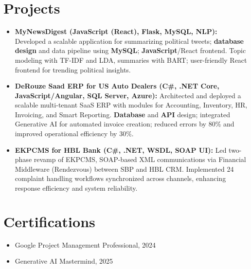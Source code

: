 \documentclass[letterpaper,10pt]{article}
\begin{document}
\section{Projects}
\begin{itemize}
    \setlength\itemsep{3pt}
    \item \textbf{MyNewsDigest (\textbf{JavaScript} (React), Flask, \textbf{MySQL}, NLP):} Developed a scalable application for summarizing political tweets; \textbf{database design} and data pipeline using \textbf{MySQL}; \textbf{JavaScript}/React frontend. Topic modeling with TF-IDF and LDA, summaries with BART; user-friendly React frontend for trending political insights.
    \item \textbf{DeRouze Saad ERP for US Auto Dealers (C\#, .NET Core, \textbf{JavaScript}/Angular, SQL Server, Azure):} Architected and deployed a scalable multi-tenant SaaS ERP with modules for Accounting, Inventory, HR, Invoicing, and Smart Reporting. \textbf{Database} and \textbf{API} design; integrated Generative AI for automated invoice creation; reduced errors by 80\% and improved operational efficiency by 30\%.
    \item \textbf{EKPCMS for HBL Bank (C\#, .NET, WSDL, SOAP UI):} Led two-phase revamp of EKPCMS, SOAP-based XML communications via Financial Middleware (Rendezvous) between SBP and HBL CRM. Implemented 24 complaint handling workflows synchronized across channels, enhancing response efficiency and system reliability.
\end{itemize}

\section{Certifications}
\begin{itemize}
    \item Google Project Management Professional, 2024
    \item Generative AI Mastermind, 2025
\end{itemize}

\vspace*{\fill}
\end{document}
